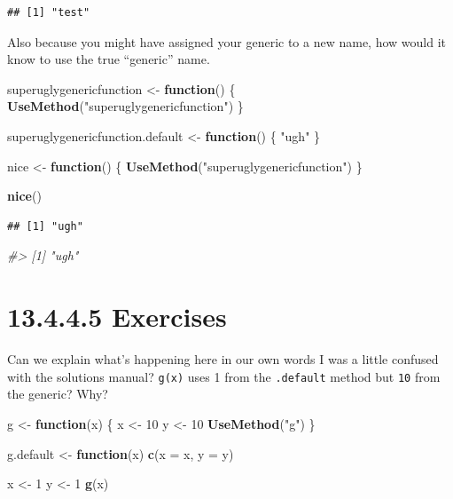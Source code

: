 \documentclass[]{book}
\newenvironment{Shaded}{\begin{snugshade}}{\end{snugshade}}
\newcommand{\CommentTok}[1]{\textcolor[rgb]{0.56,0.35,0.01}{\textit{#1}}}
\newcommand{\ControlFlowTok}[1]{\textcolor[rgb]{0.13,0.29,0.53}{\textbf{#1}}}
\newcommand{\DataTypeTok}[1]{\textcolor[rgb]{0.13,0.29,0.53}{#1}}
\newcommand{\DecValTok}[1]{\textcolor[rgb]{0.00,0.00,0.81}{#1}}
\newcommand{\KeywordTok}[1]{\textcolor[rgb]{0.13,0.29,0.53}{\textbf{#1}}}
\newcommand{\NormalTok}[1]{#1}
\newcommand{\StringTok}[1]{\textcolor[rgb]{0.31,0.60,0.02}{#1}}
\begin{document}
\begin{verbatim}
## [1] "test"
\end{verbatim}

Also because you might have assigned your generic to a new name, how would it know to use the true ``generic'' name.

\begin{Shaded}
\begin{Highlighting}[]
\NormalTok{superuglygenericfunction <-}\StringTok{ }\ControlFlowTok{function}\NormalTok{() \{}
  \KeywordTok{UseMethod}\NormalTok{(}\StringTok{"superuglygenericfunction"}\NormalTok{)}
\NormalTok{\}}

\NormalTok{superuglygenericfunction.default <-}\StringTok{ }\ControlFlowTok{function}\NormalTok{() \{}
  \StringTok{"ugh"}
\NormalTok{\}}

\NormalTok{nice <-}\StringTok{ }\ControlFlowTok{function}\NormalTok{() \{}
  \KeywordTok{UseMethod}\NormalTok{(}\StringTok{"superuglygenericfunction"}\NormalTok{)}
\NormalTok{\}}

\KeywordTok{nice}\NormalTok{()}
\end{Highlighting}
\end{Shaded}

\begin{verbatim}
## [1] "ugh"
\end{verbatim}

\begin{Shaded}
\begin{Highlighting}[]
\CommentTok{#> [1] "ugh"}
\end{Highlighting}
\end{Shaded}

\hypertarget{exercises-12}{%
\section*{13.4.4.5 Exercises}\label{exercises-12}}

Can we explain what's happening here in our own words I was a little confused with the solutions manual? \texttt{g(x)} uses 1 from the \texttt{.default} method but \texttt{10} from the generic? Why?

\begin{Shaded}
\begin{Highlighting}[]
\NormalTok{g <-}\StringTok{ }\ControlFlowTok{function}\NormalTok{(x) \{}
\NormalTok{  x <-}\StringTok{ }\DecValTok{10}
\NormalTok{  y <-}\StringTok{ }\DecValTok{10}
  \KeywordTok{UseMethod}\NormalTok{(}\StringTok{"g"}\NormalTok{)}
\NormalTok{\}}

\NormalTok{g.default <-}\StringTok{ }\ControlFlowTok{function}\NormalTok{(x) }\KeywordTok{c}\NormalTok{(}\DataTypeTok{x =}\NormalTok{ x, }\DataTypeTok{y =}\NormalTok{ y)}

\NormalTok{x <-}\StringTok{ }\DecValTok{1}
\NormalTok{y <-}\StringTok{ }\DecValTok{1}
\KeywordTok{g}\NormalTok{(x)}
\end{Highlighting}
\end{Shaded}
\end{document}
